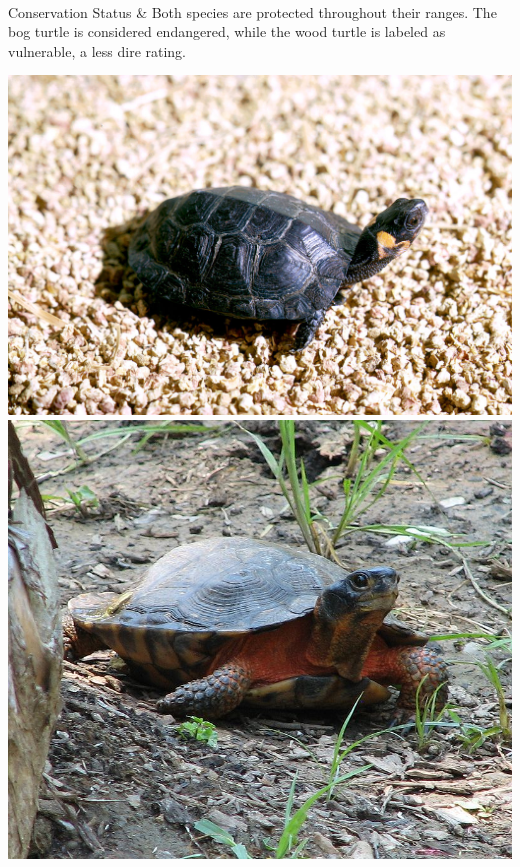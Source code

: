 \begin{center}
\begin{longtabu}
	\\
	\hline
	Conservation Status & 
	Both species are protected throughout their ranges. The bog turtle is considered endangered, while the wood turtle is labeled as vulnerable, a less dire rating.
	\\
	\hline
\end{longtabu}
\includegraphics[scale=0.5]{testudines/emydidae/glyptemys/1}
\includegraphics[scale=0.15]{testudines/emydidae/glyptemys/2}
\end{center}
